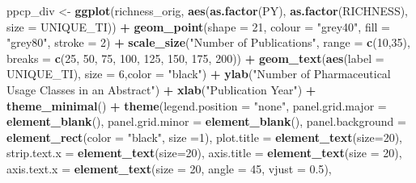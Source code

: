 \documentclass[
]{article}
\newenvironment{Shaded}{\begin{snugshade}}{\end{snugshade}}
\newcommand{\DataTypeTok}[1]{\textcolor[rgb]{0.13,0.29,0.53}{#1}}
\newcommand{\DecValTok}[1]{\textcolor[rgb]{0.00,0.00,0.81}{#1}}
\newcommand{\FloatTok}[1]{\textcolor[rgb]{0.00,0.00,0.81}{#1}}
\newcommand{\KeywordTok}[1]{\textcolor[rgb]{0.13,0.29,0.53}{\textbf{#1}}}
\newcommand{\NormalTok}[1]{#1}
\newcommand{\OperatorTok}[1]{\textcolor[rgb]{0.81,0.36,0.00}{\textbf{#1}}}
\newcommand{\StringTok}[1]{\textcolor[rgb]{0.31,0.60,0.02}{#1}}
\begin{document}
\begin{Shaded}
\begin{Highlighting}[]
{{{{{{{{{{{\NormalTok{ppcp_div <-}\StringTok{ }\KeywordTok{ggplot}\NormalTok{(richness_orig, }\KeywordTok{aes}\NormalTok{(}\KeywordTok{as.factor}\NormalTok{(PY), }\KeywordTok{as.factor}\NormalTok{(RICHNESS), }
                                      \DataTypeTok{size =}\NormalTok{ UNIQUE_TI)) }\OperatorTok{+}
\StringTok{  }\KeywordTok{geom_point}\NormalTok{(}\DataTypeTok{shape =} \DecValTok{21}\NormalTok{, }\DataTypeTok{colour =} \StringTok{"grey40"}\NormalTok{,  }
             \DataTypeTok{fill =} \StringTok{"grey80"}\NormalTok{, }\DataTypeTok{stroke =} \DecValTok{2}\NormalTok{) }\OperatorTok{+}
\StringTok{  }\KeywordTok{scale_size}\NormalTok{(}\StringTok{"Number of Publications"}\NormalTok{, }
             \DataTypeTok{range =} \KeywordTok{c}\NormalTok{(}\DecValTok{10}\NormalTok{,}\DecValTok{35}\NormalTok{), }
             \DataTypeTok{breaks =} \KeywordTok{c}\NormalTok{(}\DecValTok{25}\NormalTok{, }\DecValTok{50}\NormalTok{, }\DecValTok{75}\NormalTok{, }\DecValTok{100}\NormalTok{, }\DecValTok{125}\NormalTok{, }\DecValTok{150}\NormalTok{, }\DecValTok{175}\NormalTok{, }\DecValTok{200}\NormalTok{)) }\OperatorTok{+}
\StringTok{  }\KeywordTok{geom_text}\NormalTok{(}\KeywordTok{aes}\NormalTok{(}\DataTypeTok{label =}\NormalTok{ UNIQUE_TI), }\DataTypeTok{size =} \DecValTok{6}\NormalTok{,}\DataTypeTok{color =} \StringTok{"black"}\NormalTok{) }\OperatorTok{+}
\StringTok{  }\KeywordTok{ylab}\NormalTok{(}\StringTok{"Number of Pharmaceutical Usage Classes in an Abstract"}\NormalTok{) }\OperatorTok{+}
\StringTok{  }\KeywordTok{xlab}\NormalTok{(}\StringTok{"Publication Year"}\NormalTok{) }\OperatorTok{+}
\StringTok{  }\KeywordTok{theme_minimal}\NormalTok{() }\OperatorTok{+}
\StringTok{  }\KeywordTok{theme}\NormalTok{(}\DataTypeTok{legend.position =} \StringTok{"none"}\NormalTok{,}
        \DataTypeTok{panel.grid.major =} \KeywordTok{element_blank}\NormalTok{(), }
        \DataTypeTok{panel.grid.minor =} \KeywordTok{element_blank}\NormalTok{(),}
        \DataTypeTok{panel.background =} \KeywordTok{element_rect}\NormalTok{(}\DataTypeTok{color =} \StringTok{"black"}\NormalTok{, }\DataTypeTok{size =}\DecValTok{1}\NormalTok{),}
        \DataTypeTok{plot.title =} \KeywordTok{element_text}\NormalTok{(}\DataTypeTok{size=}\DecValTok{20}\NormalTok{),}
        \DataTypeTok{strip.text.x =} \KeywordTok{element_text}\NormalTok{(}\DataTypeTok{size=}\DecValTok{20}\NormalTok{),}
        \DataTypeTok{axis.title =} \KeywordTok{element_text}\NormalTok{(}\DataTypeTok{size =} \DecValTok{20}\NormalTok{),}
        \DataTypeTok{axis.text.x =} \KeywordTok{element_text}\NormalTok{(}\DataTypeTok{size =} \DecValTok{20}\NormalTok{, }\DataTypeTok{angle =} \DecValTok{45}\NormalTok{, }\DataTypeTok{vjust =} \FloatTok{0.5}\NormalTok{),}
}}}}}}}}}}}
\end{Highlighting}
\end{Shaded}
\end{document}
